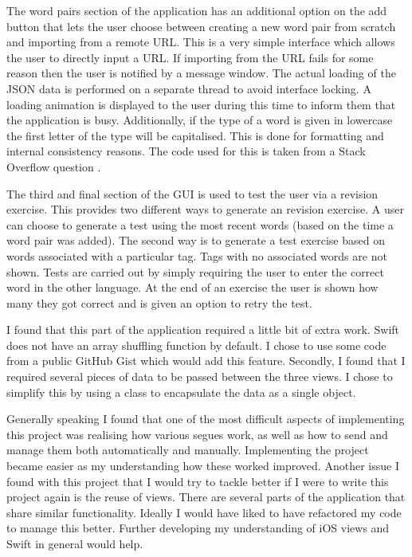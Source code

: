 \documentclass[paper=a4, fontsize=11pt]{scrartcl}	%
\numberwithin{equation}{section}															%
\numberwithin{figure}{section}																%
\numberwithin{table}{section}
\begin{document}
The word pairs section of the application has an additional option on the add button that lets the user choose between creating a new word pair from scratch and importing from a remote URL. This is a very simple interface which allows the user to directly input a URL. If importing from the URL fails for some reason then the user is notified by a message window. The actual loading of the JSON data is performed on a separate thread to avoid interface locking. A loading animation is displayed to the user during this time to inform them that the application is busy. Additionally, if the type of a word is given in lowercase the first letter of the type will be capitalised. This is done for formatting and internal consistency reasons. The code used for this is taken from a Stack Overflow question \cite{stringhelper-stackoverflow}.

The third and final section of the GUI is used to test the user via a revision exercise. This provides two different ways to generate an revision exercise. A user can choose to generate a test using the most recent words (based on the time a word pair was added). The second way is to generate a test exercise based on words associated with a particular tag. Tags with no associated words are not shown. Tests are carried out by simply requiring the user to enter the correct word in the other language. At the end of an exercise the user is shown how many they got correct and is given an option to retry the test. 

I found that this part of the application required a little bit of extra work. Swift does not have an array shuffling function by default. I chose to use some code from a public GitHub Gist \cite{arrayshuffle-gist} which would add this feature. Secondly, I found that I required several pieces of data to be passed between the three views. I chose to simplify this by using a class to encapsulate the data as a single object.

Generally speaking I found that one of the most difficult aspects of implementing this project was realising how various segues work, as well as how to send and manage them both automatically and manually. Implementing the project became easier as my understanding how these worked improved. Another issue I found with this project that I would try to tackle better if I were to write this project again is the reuse of views. There are several parts of the application that share similar functionality. Ideally I would have liked to have refactored my code to manage this better. Further developing my understanding of iOS views and Swift in general would help.
\end{document}
